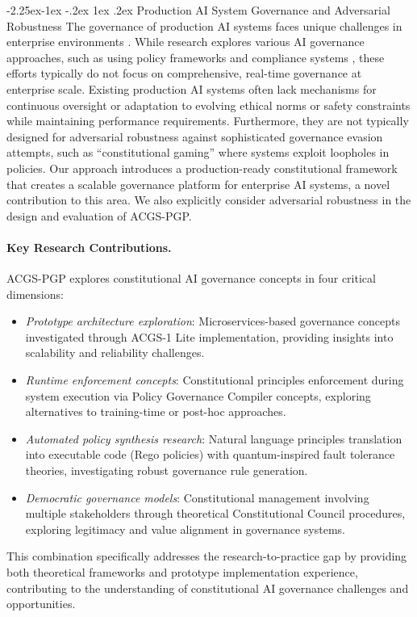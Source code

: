 \documentclass[manuscript,screen,9pt]{acmart}
\makeatletter
\renewcommand\subsection{\@startsection{subsection}{2}{\z@}%
  {-2.25ex\@plus -1ex \@minus -.2ex}%
  {1ex \@plus .2ex}%
  {\normalfont\large\bfseries}}
\makeatother
\begin{document}
\begin{table}[!htb]
\subsection{Production AI System Governance and Adversarial Robustness}
\label{subsec:related_production_governance}
The governance of production AI systems faces unique challenges in enterprise environments \cite{Chauhan2025ECLLMSurvey}. While research explores various AI governance approaches, such as using policy frameworks and compliance systems \cite{Nordin2024LLMGP}, these efforts typically do not focus on comprehensive, real-time governance at enterprise scale. Existing production AI systems often lack mechanisms for continuous oversight or adaptation to evolving ethical norms or safety constraints while maintaining performance requirements. Furthermore, they are not typically designed for adversarial robustness against sophisticated governance evasion attempts, such as ``constitutional gaming'' where systems exploit loopholes in policies. Our approach introduces a production-ready constitutional framework that creates a scalable governance platform for enterprise AI systems, a novel contribution to this area. We also explicitly consider adversarial robustness in the design and evaluation of ACGS-PGP.

\paragraph{Key Research Contributions.} ACGS-PGP explores constitutional AI governance concepts in four critical dimensions:
\begin{itemize}[leftmargin=*,itemsep=1pt,parsep=1pt]
    \item \textit{Prototype architecture exploration}: Microservices-based governance concepts investigated through ACGS-1 Lite implementation, providing insights into scalability and reliability challenges.
    \item \textit{Runtime enforcement concepts}: Constitutional principles enforcement during system execution via Policy Governance Compiler concepts, exploring alternatives to training-time or post-hoc approaches.
    \item \textit{Automated policy synthesis research}: Natural language principles translation into executable code (Rego policies) with quantum-inspired fault tolerance theories, investigating robust governance rule generation.
    \item \textit{Democratic governance models}: Constitutional management involving multiple stakeholders through theoretical Constitutional Council procedures, exploring legitimacy and value alignment in governance systems.
\end{itemize}
This combination specifically addresses the research-to-practice gap by providing both theoretical frameworks and prototype implementation experience, contributing to the understanding of constitutional AI governance challenges and opportunities.


\end{table}
\end{document}
